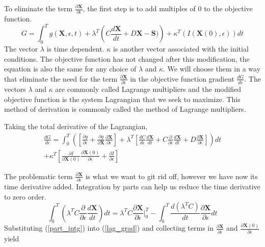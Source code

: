 \documentclass{tufte-handout}
\begin{document}
 To eliminate the term $ \frac{\partial \mathbf{X}}{\partial \epsilon}$, the first step is to  add  multiples of $0$ to the objective function.
 \begin{equation}
G =  \int^T_0 g(\mathbf{X},\epsilon,t)   + \lambda^T \left( C \frac{d \mathbf{X}}{dt} + D \mathbf{X} - \mathbf{S}) \right) + \kappa^T\left( I(\mathbf{X}(0),\epsilon) \right) dt
 \end{equation}
 The vector  $\lambda$  is time dependent. $\kappa$  is another vector associated with the initial conditions.   The objective function has not changed after this modification, the equation is also the same  for any choice of $\lambda$ and $\kappa$. We will choose them in a way that eliminate the need for  the term   $ \frac{\partial \mathbf{X}}{\partial \epsilon}$ in the objective function gradient $\frac{dG}{d\epsilon}$. The vectors $\lambda$ and $\kappa$ are commonly called Lagrange multipliers and the modified objective function is the system Lagrangian that we seek to maximize. This method of derivation is commonly called the method of Lagrange multipliers.
 
 Taking the total derivative of the Lagrangian,
 \begin{multline}\label{lag_grad}
\frac{d G}{d\epsilon} = \int_{0}^{T}\left( \left[  \frac{\partial g}{\partial \epsilon} +  \frac{\partial g}{\partial \mathbf{X}} \frac{\partial \mathbf{X}}{\partial \epsilon}\right] +  \lambda^T\left[ \frac{d C}{d \epsilon} \frac{d \mathbf{X}}{dt} + C \frac{\partial}{\partial \epsilon} \frac{d \mathbf{X}}{dt} + D \frac{\partial \mathbf{X}}{\partial \epsilon} \right]  \right) dt \\ +  \kappa^T  \left[ \frac{\partial I}{\partial \mathbf{X}(0)}  \frac{\partial \mathbf{X}(0)}{\partial \epsilon} + \frac{\partial I}{\partial \epsilon} \right] 
 \end{multline}

The problematic term  $\frac{\partial \mathbf{X}}{\partial \epsilon}$  is what we want to git rid off, however we have now its time derivative added. Integration by parts can help us reduce the time derivative to zero order.  
\begin{equation}\label{part_intg}
 \int_{0}^{T} \left(  \lambda^T C \frac{\partial}{\partial \epsilon}   \frac{d \mathbf{X}}{dt} \right) dt = \lambda^T C \frac{\partial \mathbf{X}}{\partial \epsilon}|^T_0 - \int_{0}^{T}
   \frac{ d\left(  \lambda^T C \right) }{dt} \frac{\partial \mathbf{X}}{\partial \epsilon} dt
\end{equation}
Substituting (\ref*{part_intg}) into (\ref*{lag_grad}) and collecting terms  in $\frac{\partial \mathbf{X}}{\partial \epsilon}$ and  $\frac{\partial \mathbf{X}(0)}{\partial \epsilon}$ yield
\end{document}
